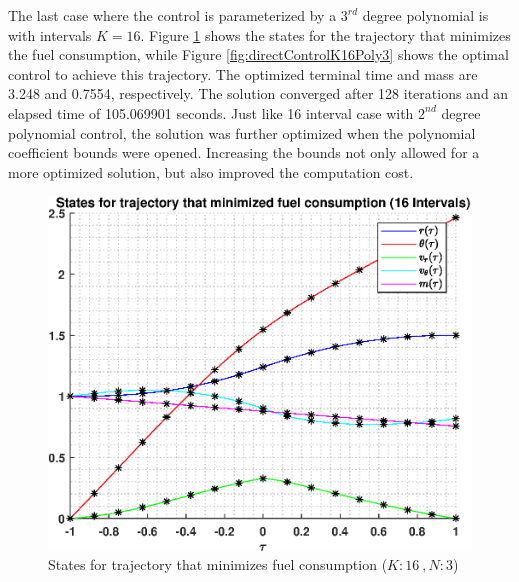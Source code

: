 \documentclass[]{article}
\begin{document}
\vspace{2mm}\newline 
The last case where the control is parameterized by a \(3^{rd}\) degree polynomial is with intervals \(K = 16\). Figure \ref{fig:directStatesK16Poly3} shows the states for the trajectory that minimizes the fuel consumption, while Figure \ref{fig:directControlK16Poly3} shows the optimal control to achieve this trajectory. The optimized terminal time and mass are 3.248 and 0.7554, respectively. The solution converged after 128 iterations and an elapsed time of 105.069901 seconds. Just like 16 interval case with \(2^{nd}\) degree polynomial control, the solution was further optimized when the polynomial coefficient bounds were opened. Increasing the bounds not only allowed for a more optimized solution, but also improved the computation cost.
\begin{figure}
	\centering
	\includegraphics[scale=0.75]{directStatesK16Poly3.eps}
	\caption{States for trajectory that minimizes fuel consumption (\(K:16\ , N:3\))}
	\label{fig:directStatesK16Poly3}
\end{figure}
\end{document}
